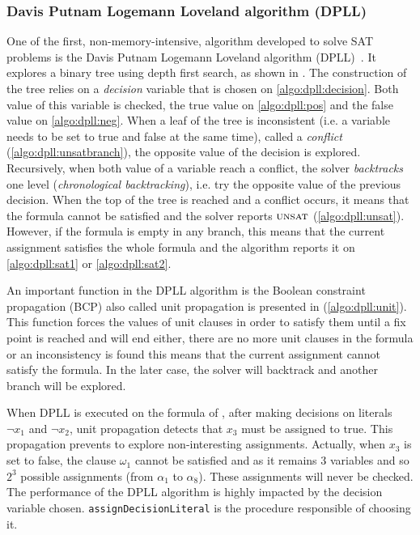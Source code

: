 \subsubsection{Davis Putnam Logemann Loveland algorithm (DPLL)}\label{sec:dpll}
One of the first, non-memory-intensive, algorithm developed to solve SAT problems is 
the Davis Putnam Logemann Loveland algorithm (DPLL)~\cite{dpll_62}. 
It explores a binary tree using depth first search, as shown in .
The construction of the tree  relies on a \emph{decision} variable  that is chosen on \cref{algo:dpll:decision}.
Both value of this variable is checked, the true value on \cref{algo:dpll:pos} and the false value on \cref{algo:dpll:neg}.
When a leaf of the tree is inconsistent (i.e. a variable needs to be set to true and false at the same time), called a \textit{conflict}
 (\cref{algo:dpll:unsatbranch}), the opposite value of the decision is explored.
Recursively, when both value of a variable reach a conflict,
the solver \emph{backtracks} one level (\emph{chronological backtracking}), i.e. try the opposite value of 
the previous decision.
When the top of the tree is reached and a conflict occurs, it means that the formula cannot be satisfied and the 
solver reports $\textsc{unsat}$ (\cref{algo:dpll:unsat}). However, if the formula is empty in any branch, 
this means that the current assignment satisfies the whole formula and the algorithm reports it on \cref{algo:dpll:sat1}
or \ref{algo:dpll:sat2}.

An important function in the DPLL algorithm is the Boolean constraint propagation (BCP) also called unit propagation
is presented in (\cref{algo:dpll:unit}).
This function forces the values of unit clauses in order to satisfy them
until a fix point is reached and will end either, there
are no more unit clauses in the formula or an inconsistency 
is found this means that the current assignment cannot satisfy the formula. 
In the later case, the solver will backtrack and another branch will be explored.

When DPLL is executed on the formula of , after making decisions on literals
$\neg x_1$ and $\neg x_2$, unit propagation detects that $x_3$ must be assigned to true.
This propagation prevents to explore non-interesting assignments. Actually, when $x_3$ is set to false,
the clause $\omega_1$ cannot be satisfied and as it remains 3 variables and so $2^3$ possible assignments
(from $\alpha_1$ to $\alpha_8$). These assignments will never be checked.
The performance of the DPLL algorithm is highly impacted by the decision variable chosen.
\texttt{assignDecisionLiteral} is the procedure responsible of choosing it.
